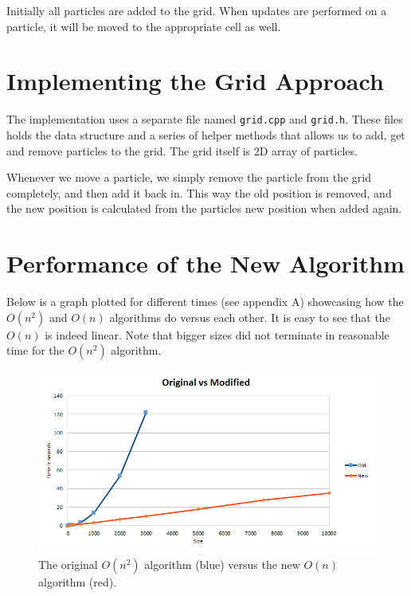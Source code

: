\documentclass[a4paper,11pt,oneside]{book}
\begin{document}
Initially all particles are added to the grid. When updates are performed on a particle, it will be moved  to the
appropriate cell as well.

\section{Implementing the Grid Approach}


The implementation uses a separate file named \verb!grid.cpp! and \verb!grid.h!. These files holds the data structure
and a series of helper methods that allows us to add, get and remove particles to the grid. The grid itself is 2D array
of particles.

Whenever we move a particle, we simply remove the particle from the grid completely, and then add it back in. This way
the old position is removed, and the new position is calculated from the particles new position when added again. 

\section{Performance of the New Algorithm}

Below is a graph plotted for different times (see appendix A) showcasing how the $O(n^{2})$ and $O(n)$ algorithms do
versus each other. It is easy to see that the $O(n)$ is indeed linear. Note that bigger sizes did not terminate in
reasonable time for the $O(n^{2})$ algorithm.

\begin{figure}[H]
  \centering
  \begin{minipage}[b]{0.9\textwidth}
    \includegraphics[width=\textwidth]{graph_regular.png}
    \caption{The original $O(n^{2})$ algorithm (blue) versus the new $O(n)$ algorithm (red).}
  \end{minipage}
\end{figure}
\end{document}
